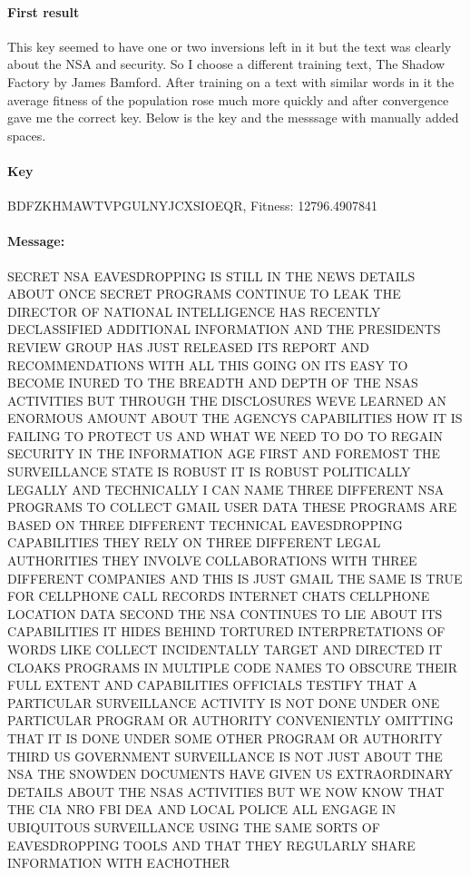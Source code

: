 \documentclass{article}
\begin{document}
\begin{enumerate}
  \paragraph{First result}{This key seemed to have one or two inversions left in it but the text was clearly about the NSA and security. So I choose a different training text, The Shadow Factory by James Bamford. After training on a text with similar words in it the average fitness of the population rose much more quickly and after convergence gave me the correct key. Below is the key and the messsage with manually added spaces.}

  \paragraph{Key}{BDFZKHMAWTVPGULNYJCXSIOEQR, Fitness: 12796.4907841}
    
  \paragraph{Message:}{SECRET NSA EAVESDROPPING IS STILL IN THE NEWS DETAILS ABOUT ONCE SECRET PROGRAMS 
    CONTINUE TO LEAK THE DIRECTOR OF NATIONAL INTELLIGENCE HAS RECENTLY DECLASSIFIED 
    ADDITIONAL INFORMATION AND THE PRESIDENTS REVIEW GROUP HAS JUST RELEASED ITS
    REPORT AND RECOMMENDATIONS WITH ALL THIS GOING ON ITS EASY TO BECOME INURED TO 
    THE BREADTH AND DEPTH OF THE NSAS ACTIVITIES BUT THROUGH THE DISCLOSURES WEVE 
    LEARNED AN ENORMOUS AMOUNT ABOUT THE AGENCYS CAPABILITIES HOW IT IS FAILING TO 
    PROTECT US AND WHAT WE NEED TO DO TO REGAIN SECURITY IN THE INFORMATION AGE FIRST 
    AND FOREMOST THE SURVEILLANCE STATE IS ROBUST IT IS ROBUST POLITICALLY LEGALLY AND TECHNICALLY 
    I CAN NAME THREE DIFFERENT NSA PROGRAMS TO COLLECT GMAIL USER DATA THESE PROGRAMS 
    ARE BASED ON THREE DIFFERENT TECHNICAL EAVESDROPPING CAPABILITIES THEY RELY ON 
    THREE DIFFERENT LEGAL AUTHORITIES THEY INVOLVE COLLABORATIONS WITH THREE DIFFERENT 
    COMPANIES AND THIS IS JUST GMAIL THE SAME IS TRUE FOR CELLPHONE CALL RECORDS 
    INTERNET CHATS CELLPHONE LOCATION DATA SECOND THE NSA CONTINUES TO LIE ABOUT ITS 
    CAPABILITIES IT HIDES BEHIND TORTURED INTERPRETATIONS OF WORDS LIKE COLLECT 
    INCIDENTALLY TARGET AND DIRECTED IT CLOAKS PROGRAMS IN MULTIPLE CODE NAMES TO 
    OBSCURE THEIR FULL EXTENT AND CAPABILITIES OFFICIALS TESTIFY THAT A PARTICULAR SURVEILLANCE 
    ACTIVITY IS NOT DONE UNDER ONE PARTICULAR PROGRAM OR AUTHORITY CONVENIENTLY OMITTING 
    THAT IT IS DONE UNDER SOME OTHER PROGRAM OR AUTHORITY THIRD US GOVERNMENT SURVEILLANCE 
    IS NOT JUST ABOUT THE NSA THE SNOWDEN DOCUMENTS HAVE GIVEN US EXTRAORDINARY DETAILS 
    ABOUT THE NSAS ACTIVITIES BUT WE NOW KNOW THAT THE CIA NRO FBI DEA AND LOCAL POLICE ALL 
    ENGAGE IN UBIQUITOUS SURVEILLANCE USING THE SAME SORTS OF EAVESDROPPING TOOLS AND THAT
    THEY REGULARLY SHARE INFORMATION WITH EACHOTHER}



\end{enumerate}
\end{document}
